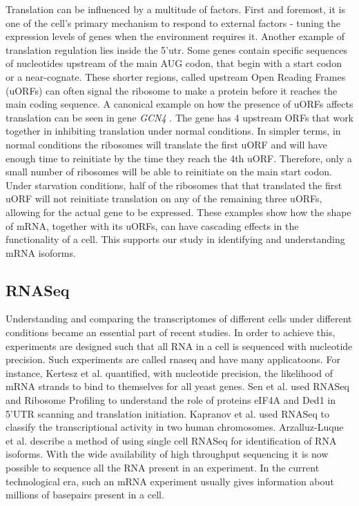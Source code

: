 \documentclass[12pt]{article}
\begin{document}
Translation can be influenced by a multitude of factors. First and foremost, it is one of the cell's primary mechanism to respond to external factors - tuning the expression levels of genes when the environment requires it. Another example of translation regulation lies inside the 5'\gls{utr}. Some genes contain specific sequences of nucleotides upstream of the main AUG codon, that begin with a start codon or a near-cognate. These shorter regions, called upstream Open Reading Frames (uORFs) can often signal the ribosome to make a protein before it reaches the main coding sequence. A canonical example on how the presence of uORFs affects translation can be seen in gene \textit{GCN4} \cite{Hinnebusch1997}. The gene has 4 upstream ORFs that work together in inhibiting translation under normal conditions. In simpler terms, in normal conditions the ribosomes will translate the first uORF and will have enough time to reinitiate by the time they reach the 4th uORF. Therefore, only a small number of ribosomes will be able to reinitiate on the main start codon. Under starvation conditions, half of the ribosomes that that translated the first uORF will not reinitiate translation on any of the remaining three uORFs, allowing for the actual gene to be expressed. These examples show how the shape of mRNA, together with its uORFs, can have cascading effects in the functionality of a cell. This supports our study in identifying and understanding mRNA isoforms. 

\subsection{RNASeq}
    Understanding and comparing the transcriptomes of different cells under different conditions became an essential part of recent studies. In order to achieve this, experiments are designed such that all RNA in a cell is sequenced with nucleotide precision. Such experiments are called \gls{rnaseq} and have many applicatoons. For instance, Kertesz et al. \cite{Kertesz2010} quantified, with nucleotide precision, the likelihood of mRNA strands to bind to themselves for all yeast genes. Sen et al. \cite{ Sen2015} used RNASeq and Ribosome Profiling to understand the role of proteins eIF4A and Ded1 in 5'UTR scanning and translation initiation. Kapranov et al. \cite{Kapranov2002} used RNASeq to classify the transcriptional activity in two human chromosomes. Arzalluz-Luque et al. \cite{ArzalluzLuque2018} describe a method of using single cell RNASeq for identification of RNA isoforms. With the wide availability of high throughput sequencing it is now possible to sequence all the RNA  present in an experiment\cite{Kukurba2015, Wang2009}. In the current technological era, such an mRNA experiment usually gives information about millions of basepairs present in a cell. 
    
\end{document}
